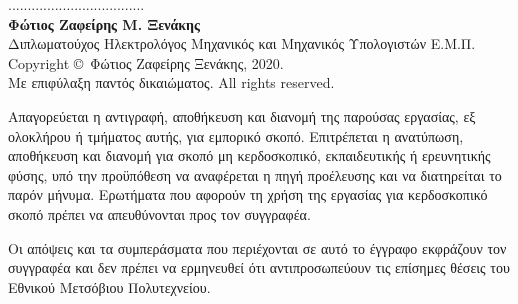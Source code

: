 \documentclass[12pt, a4paper, notitlepage]{report}
\newcommand{\en}[1]{\foreignlanguage{english}{#1}}
\newcommand{\blankpage}{\newpage\null\thispagestyle{empty}\newpage}
\begin{document}
\newpage
\vspace*{14ex}
\noindent
................................... \\
\textbf{Φώτιος Ζαφείρης Μ. Ξενάκης} \\
Διπλωματούχος Ηλεκτρολόγος Μηχανικός και Μηχανικός Υπολογιστών Ε.Μ.Π. \\
\vfill
\small
\noindent
\en{Copyright} \copyright\ Φώτιος Ζαφείρης Ξενάκης, 2020. \\
Με επιφύλαξη παντός δικαιώματος. \en{All rights reserved.}

\vspace{2ex}
\noindent
Απαγορεύεται η αντιγραφή, αποθήκευση και διανομή της παρούσας εργασίας, εξ
ολοκλήρου ή τμήματος αυτής, για εμπορικό σκοπό. Επιτρέπεται η ανατύπωση,
αποθήκευση και διανομή για σκοπό μη κερδοσκοπικό, εκπαιδευτικής ή ερευνητικής
φύσης, υπό την προϋπόθεση να αναφέρεται η πηγή προέλευσης και να διατηρείται το
παρόν μήνυμα. Ερωτήματα που αφορούν τη χρήση της εργασίας για κερδοσκοπικό σκοπό
πρέπει να απευθύνονται προς τον συγγραφέα.

\noindent
Οι απόψεις και τα συμπεράσματα που περιέχονται σε αυτό το έγγραφο εκφράζουν τον
συγγραφέα και δεν πρέπει να ερμηνευθεί ότι αντιπροσωπεύουν τις επίσημες θέσεις
του Εθνικού Μετσόβιου Πολυτεχνείου.
\thispagestyle{empty}

\newpage


\blankpage



\blankpage



\blankpage

\tableofcontents
{}

\listoffigures
{}

\listoftables
{}







\appendix




\end{document}
